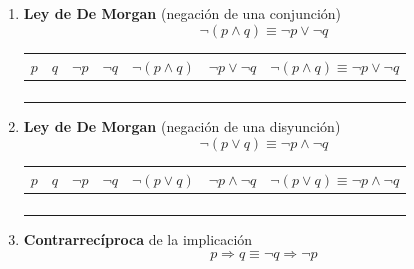 \begin{enumerate}[label=\alph*)]
\item \textbf{Ley de De Morgan} (negación de una conjunción)
\[\lnot(p \land q) \equiv \lnot p \vee \lnot q\]

\begin{center}
	\renewcommand{\arraystretch}{1.4}
	\begin{tabular}{|c|c|c|c|c|c||c|}
		\hline
		$p$ & $q$ & $\lnot p$ & $\lnot q$ & $\lnot(p \land q)$ & $\lnot p \vee \lnot q$ & $\lnot(p \land q) \equiv \lnot p \vee \lnot q$ \\
		\hline
		\V & \V & \F & \F & \F & \F & \V \\
		\hline
		\V & \F & \F & \V & \V & \V & \V \\
		\hline
		\F & \V & \V & \F & \V & \V & \V \\
		\hline
		\F & \F & \V & \V & \V & \V & \V \\
		\hline
	\end{tabular}
\end{center}

\item \textbf{Ley de De Morgan} (negación de una disyunción)
\[\lnot(p \vee q) \equiv \lnot p \land \lnot q\]

\begin{center}
	\renewcommand{\arraystretch}{1.4}
	\begin{tabular}{|c|c|c|c|c|c||c|}
		\hline
		$p$ & $q$ & $\lnot p$ & $\lnot q$ & $\lnot(p \vee q)$ & $\lnot p \land \lnot q$ & $\lnot(p \vee q) \equiv \lnot p \land \lnot q$ \\
		\hline
		\V & \V & \F & \F & \F & \F & \V \\
		\hline
		\V & \F & \F & \V & \F & \F & \V \\
		\hline
		\F & \V & \V & \F & \F & \F & \V \\
		\hline
		\F & \F & \V & \V & \V & \V & \V \\
		\hline
	\end{tabular}
\end{center}

\item \textbf{Contrarrecíproca} de la implicación
\[p \Rightarrow q \equiv \lnot q \Rightarrow \lnot p\]


\end{enumerate}
